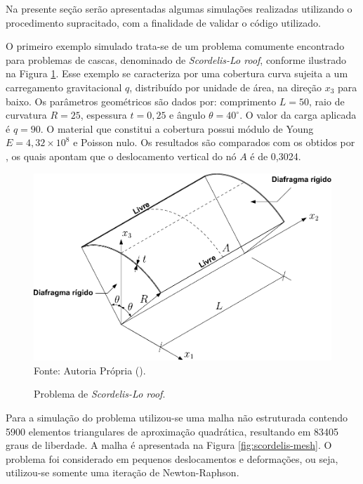 Na presente seção serão apresentadas algumas simulações realizadas utilizando o procedimento supracitado, com a finalidade de validar o código utilizado.


O primeiro exemplo simulado trata-se de um problema comumente encontrado para problemas de cascas, denominado de \textit{Scordelis-Lo roof}, conforme ilustrado na Figura \ref{fig:scordelis}. Esse exemplo se caracteriza por uma cobertura curva sujeita a um carregamento gravitacional $q$, distribuído por unidade de área, na direção $x_3$ para baixo. Os parâmetros geométricos são dados por: comprimento $L=50$, raio de curvatura $R=25$, espessura $t=0,25$ e ângulo $\theta=40^\circ$. O valor da carga aplicada é $q=90$. O material que constitui a cobertura possui módulo de Young $E=4,32\times10^8$ e Poisson nulo. Os resultados são comparados com os obtidos por , os quais apontam que o deslocamento vertical do nó $A$ é de 0,3024.

\begin{figure}[h!]
    \centering
    \caption{Problema de \textit{Scordelis-Lo roof}.}
    \includegraphics[width=0.75\linewidth]{Figuras/scordelis/scordelis_lo.pdf}
    \\Fonte: Autoria Própria (\the\year).
    \label{fig:scordelis}
\end{figure}

Para a simulação do problema utilizou-se uma malha não estruturada contendo 5900 elementos triangulares de aproximação quadrática, resultando em 83405 graus de liberdade. A malha é apresentada na Figura \ref{fig:scordelis-mesh}. O problema foi considerado em pequenos deslocamentos e deformações, ou seja, utilizou-se somente uma iteração de Newton-Raphson.


